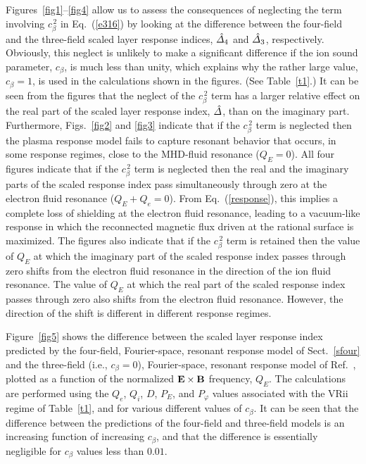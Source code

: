 \documentclass[12pt,prb,aps]{revtex4-1}
\begin{document}
Figures~\ref{fig1}--\ref{fig4} allow us to assess the consequences of neglecting the term involving $c_\beta^{\,2}$ in Eq.~(\ref{e316}) by looking
at the difference between the four-field and the three-field scaled layer response indices,  $\hat{\mit\Delta}_4$ and $\hat{\mit\Delta}_3$, respectively. 
Obviously, this neglect is unlikely  to make a significant difference if the ion sound parameter, $c_\beta$, is much less than unity, which explains
why the rather large value, $c_\beta=1$, is used in the calculations shown in the figures. (See Table~\ref{t1}.) It can be seen from the figures that
the neglect of the $c_\beta^{\,2}$ term has a larger relative effect on the real part of the scaled layer response index, $\hat{\mit\Delta}$,  than on the imaginary part.
Furthermore, Figs.~\ref{fig2} and \ref{fig3} indicate that if the $c_\beta^{\,2}$ term is neglected then the plasma response model fails to capture resonant behavior
that occurs, in some response regimes,  close to the MHD-fluid resonance ($Q_E=0$). All four figures indicate that if the $c_\beta^{\,2}$ term is neglected then the real and the imaginary parts
of the scaled response index pass simultaneously through zero  at the electron fluid resonance ($Q_E+Q_e=0$). From Eq.~(\ref{response}), this implies a
complete loss of shielding at the electron fluid resonance, leading to a vacuum-like response in which the reconnected magnetic flux
driven at the rational surface is maximized. The figures also indicate that if the $c_\beta^{\,2}$ term is retained then 
the value of $Q_E$  at which the imaginary part of the scaled response index passes through zero shifts from the electron fluid
resonance in the direction of the ion fluid resonance.\cite{lee} The value of $Q_E$ at which the real part of the scaled response index passes through zero also shifts from the electron fluid resonance. However, the direction of the shift is different in different response regimes.

Figure~\ref{fig5} shows the difference between the scaled layer response index predicted by the 
four-field, Fourier-space, resonant response model of Sect.~\ref{sfour} and the  three-field (i.e., $c_\beta=0$), Fourier-space,  resonant response model of Ref.~, plotted
as a function of the normalized ${\bf E}\times {\bf B}$ frequency, $Q_E$. The calculations are performed using the $Q_e$, $Q_i$, $D$, $P_E$,
and $P_\varphi$ values associated with the VRii regime of Table~\ref{t1}, and for various different values of $c_\beta$.  It can be seen that the
difference between the predictions of the four-field and three-field  models is an increasing function of increasing $c_\beta$, and that the difference is essentially
negligible for $c_\beta$ values less than $0.01$.
\end{document}
